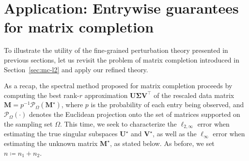 \section{Application: Entrywise guarantees for matrix completion}

To illustrate the utility of the fine-grained perturbation theory presented in previous sections, let us revisit the problem of matrix completion introduced in Section~\ref{sec:mc-l2} and apply our refined theory.


As a recap, the spectral method proposed for matrix completion proceeds by computing the best rank-$r$ approximation $\bm{U}\bm{\Sigma}\bm{V}^{\top}$ of the rescaled data matrix $\bm{M}=p^{-1}\mathcal{P}_{\Omega}(\bm{M}^{\star})$, where $p$ is the probability of each entry being observed, and $\mathcal{P}_{\Omega}(\cdot)$ denotes the Euclidean projection onto the set of matrices supported on the sampling set $\Omega$.
This time, we seek to characterize the $\ell_{2,\infty}$ error when estimating the true singular subspaces $\bm{U}^{\star}$ and $\bm{V}^{\star}$,
as well as the $\ell_{\infty}$ error when estimating the unknown matrix $\bm{M}^{\star}$, as stated below. As before, we set $n \coloneqq n_1 + n_2$.




